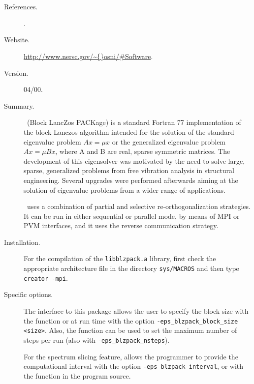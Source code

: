 \section*{\underline{\blzpack}}
	\begin{description}
	\item[References.]\citep{Marques:1995:BDU}.
	\item[Website.] \url{http://www.nersc.gov/\~{}osni/\#Software}.
	\item[Version.] 04/00.
	\item[Summary.] \blzpack\ (Block LancZos PACKage) is a standard Fortran 77 implementation of the block Lanczos algorithm intended for the solution of the standard eigenvalue problem $Ax=\mu x$ or the generalized eigenvalue problem $Ax=\mu Bx$, where A and B are real, sparse symmetric matrices. The development of this eigensolver was motivated by the need to solve large, sparse, generalized problems from free vibration analysis in structural engineering. Several upgrades were performed afterwards aiming at the solution of eigenvalue problems from a wider range of applications.

	\blzpack\ uses a combination of partial and selective re-orthogonalization strategies. It can be run in either sequential or parallel mode, by means of MPI or PVM interfaces, and it uses the reverse communication strategy.
	\item[Installation.] For the compilation of the \texttt{libblzpack.a} library, first check the appropriate architecture file in the directory \texttt{sys/MACROS} and then type \texttt{creator -mpi}.
	\item[Specific options.] The \slepc interface to this package allows the user to specify the block size with the function  or at run time with the option \Verb!-eps_blzpack_block_size <size>!. Also, the function  can be used to set the maximum number of steps per run (also with \Verb!-eps_blzpack_nsteps!).

	For the spectrum slicing feature, \slepc allows the programmer to provide the computational interval with the option \Verb!-eps_blzpack_interval!, or with the function  in the program source.
	\end{description}

